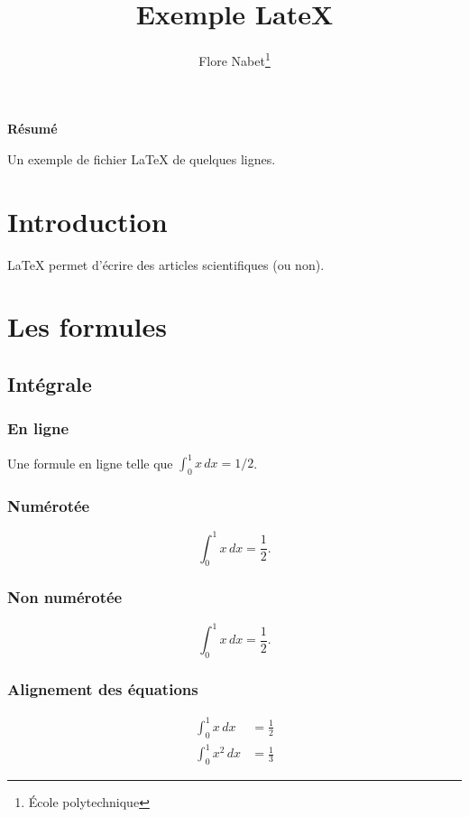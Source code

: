 \documentclass{article}
\title{Exemple LateX}
\author{Flore Nabet\footnote{\'Ecole polytechnique}}
\begin{document}
\maketitle						%

\tableofcontents					%
\listoffigures						%


\begin{center}
\textbf{Résumé}
\end{center}
Un exemple de fichier {\LaTeX} de quelques lignes.

\section{Introduction}
{\LaTeX} permet d'écrire des articles scientifiques (ou non).

\section{Les formules}

\subsection{Intégrale}

\subsubsection{En ligne}
Une formule en ligne telle que $\int_0^1 x\,dx=1/2$.

\subsubsection{Numérotée}
\begin{equation}
\label{Formule1}
\int_0^1 x\,dx=\frac 1 2.
\end{equation}

\subsubsection{Non numérotée}
\begin{equation*}
\int_0^1 x\,dx=\frac 1 2.
\end{equation*}


\subsubsection{Alignement des équations}
\begin{align}
\int_0^1 x\,dx&=\frac 1 2 \\
\int_0^1 x^2 \,dx &= \frac 1 3
\end{align}
\end{document}
